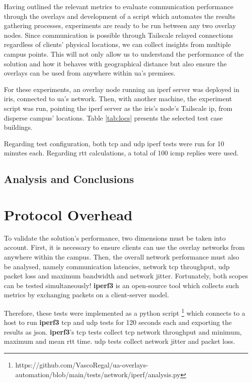 \documentclass[11pt,twoside,a4paper]{report}
\begin{document}
Having outlined the relevant metrics to evaluate communication performance through the overlays and development of a script which automates the results gathering processes, experiments are ready to be run between any two overlay nodes. Since communication is possible through Tailscale relayed connections regardless of clients' physical locations, we can collect insights from multiple campus points. This will not only allow us to understand the performance of the solution and how it behaves with geographical distance but also ensure the overlays can be used from anywhere within \ac{ua}'s premises.

For these experiments, an overlay node running an iperf server was deployed in \ac{iris}, connected to \ac{ua}'s network. Then, with another machine, the experiment script was run, pointing the iperf server as the \ac{iris}'s node's Tailscale \ac{ip}, from disperse campus' locations. Table \ref{tab:locs} presents the selected test case buildings.

Regarding test configuration, both \ac{tcp} and \ac{udp} iperf tests were run for 10 minutes each. Regarding \ac{rtt} calculations, a total of 100 \ac{icmp} replies were used.

\subsection{Analysis and Conclusions}


\iffalse
\section{Protocol Overhead}

To validate the solution's performance, two dimensions must be taken into account. First, it is necessary to ensure clients can use the overlay networks from anywhere within the campus. Then, the overall network performance must also be analysed, namely communication latencies, network \ac{tcp} throughput, \ac{udp} packet loss and maximum bandwidth and network jitter. Fortunately, both scopes can be tested simultaneously! \textbf{iperf3} is an open-source tool which collects such metrics by exchanging packets on a client-server model.

Therefore, these tests were implemented as a python script \footnote{https://github.com/VascoRegal/ua-overlays-automation/blob/main/tests/network/iperf/analysis.py} which connects to a host to run \textbf{iperf3} \ac{tcp} and \ac{udp} tests for 120 seconds each and exporting the results as \ac{json}. \textbf{iperf3}'s \ac{tcp} tests collect \ac{tcp} network throughput and minimum, maximum and mean \ac{rtt} time. \ac{udp} tests collect network jitter and packet loss.
\end{document}
